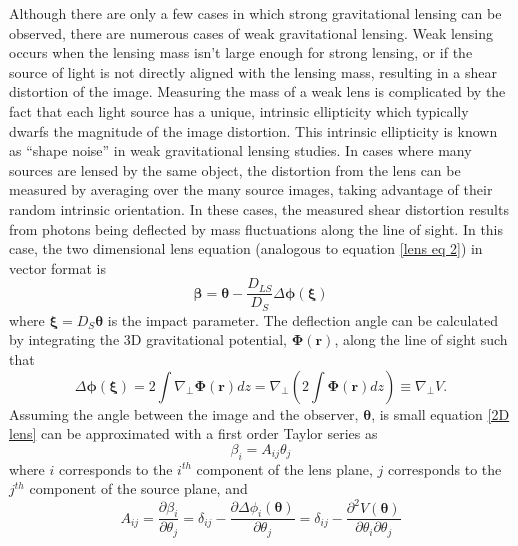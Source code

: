 \documentclass[a4paper,12pt]{article}
\begin{document}
Although there are only a few cases in which strong gravitational lensing can be observed, there are numerous cases of weak gravitational lensing.  Weak lensing occurs when the lensing mass isn't large enough for strong lensing, or if the source of light is not directly aligned with the lensing mass, resulting in a shear distortion of the image.  Measuring the mass of a weak lens is complicated by the fact that each light source has a unique, intrinsic ellipticity which typically dwarfs the magnitude of the image distortion.  This intrinsic ellipticity is known as ``shape noise'' in weak gravitational lensing studies.  In cases where many sources are lensed by the same object, the distortion from the lens can be measured by averaging over the many source images, taking advantage of their random intrinsic orientation.  In these cases, the measured shear distortion results from photons being deflected by mass fluctuations along the line of sight.  In this case, the two dimensional lens equation (analogous to equation \ref{lens eq 2}) in vector format is
\begin{equation} \label{2D lens}
\boldsymbol{\beta} = \boldsymbol{\theta} - \frac{D_{LS}}{D_S} \Delta \boldsymbol{\phi}(\boldsymbol{\xi})
\end{equation}
where $\boldsymbol{\xi}=D_{S}\boldsymbol{\theta}$ is the impact parameter.  The deflection angle can be calculated by integrating the 3D gravitational potential, $\boldsymbol{\Phi}(\mathbf{r})$, along the line of sight such that
\begin{equation} \label{3D angle}
\Delta \boldsymbol{\phi}(\boldsymbol{\xi}) = 2 \int \nabla_\perp \boldsymbol{\Phi}(\mathbf{r})dz = \nabla_\perp \left(2\int \boldsymbol{\Phi}(\mathbf{r}) dz \right) \equiv \nabla_\perp V.
\end{equation}
Assuming the angle between the image and the observer, $\boldsymbol{\theta}$, is small equation \ref{2D lens} can be approximated with a first order Taylor series as
\begin{equation} \label{lens taylor}
\beta_{i}=A_{ij} \theta_{j}
\end{equation}
where $i$ corresponds to the $i^{th}$ component of the lens plane, $j$ corresponds to the $j^{th}$ component of the source plane, and 
\begin{equation} \label{dist matrix elements}
A_{ij}=\frac{ \partial \beta_i}{\partial \theta_j} = \delta_{ij} - \frac{ \partial \Delta \phi_i( \boldsymbol{\theta}) }{\partial \theta_j} = \delta_{ij} - 
\frac{ \partial ^2 V(\boldsymbol{\theta})} {\partial \theta_i \partial \theta_j}
\end{equation}
\end{document}
